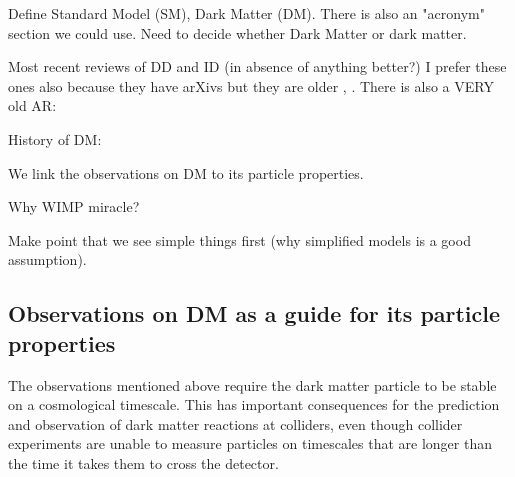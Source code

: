 Define Standard Model (SM), Dark Matter (DM). There is also an "acronym" section we could use. 
Need to decide whether Dark Matter or dark matter.

Most recent reviews of DD and ID (in absence of anything better?)
\cite{DMDD_NaturePhysics}
\cite{DMID_NaturePhysics}
I prefer these ones also because they have arXivs but they are older \cite{Gaskins:2016cha}, \cite{0954-3899-43-1-013001}. There is also a VERY old AR: \cite{doi:10.1146/annurev.nucl.54.070103.181244}

History of DM: ~\cite{Bertone:2016nfn}



We link the observations on DM to its particle properties.

Why WIMP miracle?

Make point that we see simple things first (why simplified models is a good assumption). 

\subsection{Observations on DM as a guide for its particle properties}
\label{sec:DMObservations}


The observations mentioned above require the dark matter particle to be stable on a cosmological timescale. This has important consequences for the prediction and observation of dark matter reactions at colliders, even though collider experiments are unable to measure particles on timescales that are longer than the time it takes them to cross the detector. 

\begin{marginnote}[]
\end{marginnote}

